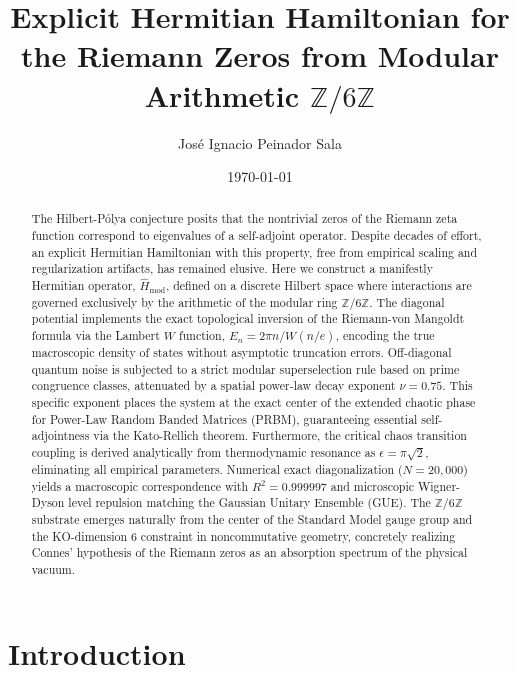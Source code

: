 \documentclass[prl,aps,floatfix,superscriptaddress,10pt]{revtex4-2}
\newcommand{\Zmod}{\mathbb{Z}/6\mathbb{Z}}
\begin{document}
\title{Explicit Hermitian Hamiltonian for the Riemann Zeros from Modular Arithmetic \texorpdfstring{$\Zmod$}{Z/6Z}}

\author{José Ignacio Peinador Sala }

\date{\today}

\begin{abstract}
The Hilbert-P\'olya conjecture posits that the nontrivial zeros of the Riemann zeta function correspond to eigenvalues of a self-adjoint operator. Despite decades of effort, an explicit Hermitian Hamiltonian with this property, free from empirical scaling and regularization artifacts, has remained elusive. Here we construct a manifestly Hermitian operator, $\hat{H}_{\text{mod}}$, defined on a discrete Hilbert space where interactions are governed exclusively by the arithmetic of the modular ring $\mathbb{Z}/6\mathbb{Z}$. The diagonal potential implements the exact topological inversion of the Riemann-von Mangoldt formula via the Lambert $W$ function, $E_n = 2\pi n / W(n/e)$, encoding the true macroscopic density of states without asymptotic truncation errors. Off-diagonal quantum noise is subjected to a strict modular superselection rule based on prime congruence classes, attenuated by a spatial power-law decay exponent $\nu = 0.75$. This specific exponent places the system at the exact center of the extended chaotic phase for Power-Law Random Banded Matrices (PRBM), guaranteeing essential self-adjointness via the Kato-Rellich theorem. Furthermore, the critical chaos transition coupling is derived analytically from thermodynamic resonance as $\epsilon = \pi \sqrt{2}$, eliminating all empirical parameters. Numerical exact diagonalization ($N=20,000$) yields a macroscopic correspondence with $R^2 = 0.999997$ and microscopic Wigner-Dyson level repulsion matching the Gaussian Unitary Ensemble (GUE). The $\Zmod$ substrate emerges naturally from the center of the Standard Model gauge group and the KO-dimension 6 constraint in noncommutative geometry, concretely realizing Connes' hypothesis of the Riemann zeros as an absorption spectrum of the physical vacuum.
\end{abstract}

\maketitle

\section{Introduction}
\end{document}
